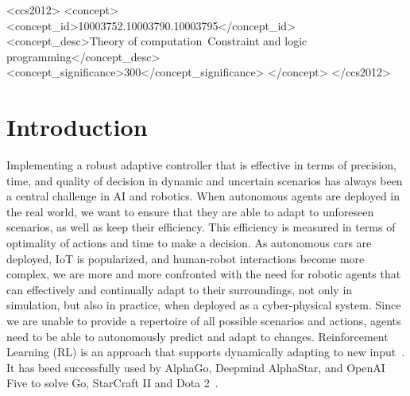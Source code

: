 \documentclass[acmsmall]{acmart}
\theoremstyle{definition}
\newcommand{\giselle}[1]{\todo[linecolor=red,backgroundcolor=red!25,bordercolor=red]{G: #1}}
\begin{document}
\begin{CCSXML}
  <ccs2012>
     <concept>
         <concept_id>10003752.10003790.10003795</concept_id>
         <concept_desc>Theory of computation~Constraint and logic programming</concept_desc>
         <concept_significance>300</concept_significance>
         </concept>
   </ccs2012>
\end{CCSXML}
  



\maketitle

\section{Introduction}

Implementing a robust adaptive controller that is effective in terms
of precision, time, and quality of decision in dynamic and uncertain
scenarios has always been a central challenge in AI and robotics. When
autonomous agents are deployed in the real world, we want to ensure
that they are able to adapt to unforeseen scenarios, as well as keep
their efficiency. This efficiency is measured in terms of optimality
of actions and time to make a decision. 
%
As autonomous cars are deployed, IoT is popularized, and human-robot
interactions become more complex, we are more and more confronted with
the need for robotic agents that can effectively and continually adapt
to their surroundings, not only in simulation, but also in practice,
when deployed as a cyber-physical system.\giselle{Potential to recover
space.}
Since we are unable to
provide a repertoire of all possible scenarios and actions, agents
need to be able to autonomously predict and adapt to changes.
Reinforcement Learning (RL) is an approach that supports dynamically
adapting to new input~\cite{sutton2018reinforcement}. It has beed
successfully used by AlphaGo, Deepmind AlphaStar, and OpenAI Five to
solve Go, StarCraft II and Dota 2~\cite{li2019reinforcement}.
\end{document}

